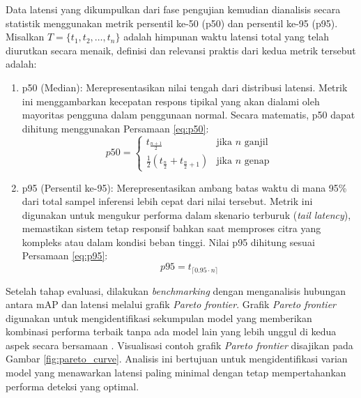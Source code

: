 Data latensi yang dikumpulkan dari fase pengujian kemudian dianalisis secara statistik menggunakan metrik persentil ke-50 (p50) dan persentil ke-95 (p95). Misalkan $T = \{t_1, t_2, \dots, t_n\}$ adalah himpunan waktu latensi total yang telah diurutkan secara menaik, definisi dan relevansi praktis dari kedua metrik tersebut adalah:

\begin{enumerate}[nosep]
    \item p50 (Median): Merepresentasikan nilai tengah dari distribusi latensi. Metrik ini menggambarkan kecepatan respons tipikal yang akan dialami oleh mayoritas pengguna dalam penggunaan normal. Secara matematis, p50 dapat dihitung menggunakan Persamaan \ref{eq:p50}:
    \begin{equation}
        p50 = \begin{cases} t_{\frac{n+1}{2}} & \text{jika } n \text{ ganjil} \\ \frac{1}{2} (t_{\frac{n}{2}} + t_{\frac{n}{2}+1}) & \text{jika } n \text{ genap} \end{cases}
        \label{eq:p50}
    \end{equation}

    \item p95 (Persentil ke-95): Merepresentasikan ambang batas waktu di mana 95\% dari total sampel inferensi lebih cepat dari nilai tersebut. Metrik ini digunakan untuk mengukur performa dalam skenario terburuk (\textit{tail latency}), memastikan sistem tetap responsif bahkan saat memproses citra yang kompleks atau dalam kondisi beban tinggi. Nilai p95 dihitung sesuai Persamaan \ref{eq:p95}:
    \begin{equation}
        p95 = t_{\lceil 0.95 \cdot n \rceil}
        \label{eq:p95}
    \end{equation}
\end{enumerate}

Setelah tahap evaluasi, dilakukan \textit{benchmarking} dengan menganalisis hubungan antara mAP dan latensi melalui grafik \textit{Pareto frontier}. Grafik \textit{Pareto frontier} digunakan untuk mengidentifikasi sekumpulan model yang memberikan kombinasi performa terbaik tanpa ada model lain yang lebih unggul di kedua aspek secara bersamaan \parencite{shakyaSmallObjectDetectionEdge2026}. Visualisasi contoh grafik \textit{Pareto frontier} disajikan pada Gambar \ref{fig:pareto_curve}. Analisis ini bertujuan untuk mengidentifikasi varian model yang menawarkan latensi paling minimal dengan tetap mempertahankan performa deteksi yang optimal.

